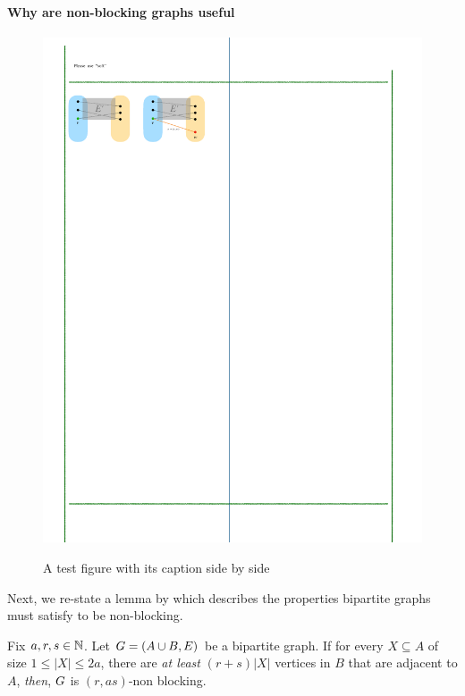 \documentclass[11pt]{article}
\begin{document}
\paragraph{Why are non-blocking graphs useful} \par
\begin{figure}[h]
\center
{\caption{A test figure with its caption side by side}\label{fig:test}}
{\includegraphics{assets/non-blocking-networks.pdf}}
\end{figure}

Next, we re-state a lemma by \citep[Proposition 1]{feldman1988wide} which describes the properties bipartite graphs must satisfy to be non-blocking.

\begin{lemma}\label{lemma:condtions-for-non-block}
Fix $a, r, s \in \mathbb{N}$. Let $G = (A \cup B, E)$ be a bipartite graph.
If for every $X \subseteq A$ of size $1 \leq |X| \leq 2a$, there are \emph{at least} $(r + s)|X|$ vertices in $B$ that are adjacent to $A$, \emph{then}, $G$ is $(r, as)$-non blocking.
\end{lemma}
\end{document}
